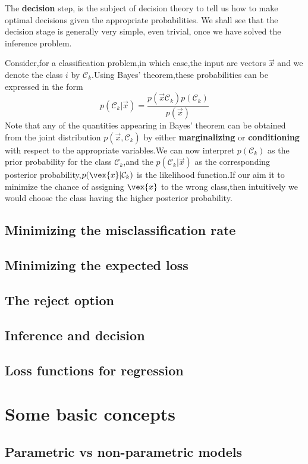 The \textbf{decision} step, is the subject of decision theory to tell us how to make optimal decisions given the appropriate probabilities. We shall see that the decision stage is generally very simple, even trivial, once we have solved the inference problem.

Consider,for a classification problem,in which case,the input are vectors  $\vec{x}$ and we denote the class $i$ by $\mathcal{C}_k$.Using Bayes' theorem,these probabilities can be expressed in the form
\begin{equation}
p(\mathcal{C}_k|\vec{x}) = \dfrac{p(\vec{x}\mathcal{C}_k)p(\mathcal{C}_k)}{p(\vec{x})}
\end{equation}
Note that any of the quantities appearing in Bayes' theorem can be obtained from the joint distribution $p(\vec{x},\mathcal{C}_k)$ by either \textbf{marginalizing} or \textbf{conditioning} with respect to the appropriate variables.We can now interpret $p(\mathcal{C}_k)$ as the prior probability for the class $\mathcal{C}_k$,and the $p(\mathcal{C}_k|\vec{x})$ as the corresponding posterior probability,$p(\vex{x}|\mathcal{C}_k)$ is the likelihood function.If our aim it to minimize the chance of assigning $\vex{x}$ to the wrong class,then intuitively we would choose the class having the higher posterior probability.
\subsection{Minimizing the misclassification rate}
\subsection{Minimizing the expected loss}
\subsection{The reject option}
\subsection{Inference and decision}
\subsection{Loss functions for regression}
\section{Some basic concepts}


\subsection{Parametric vs non-parametric models}


